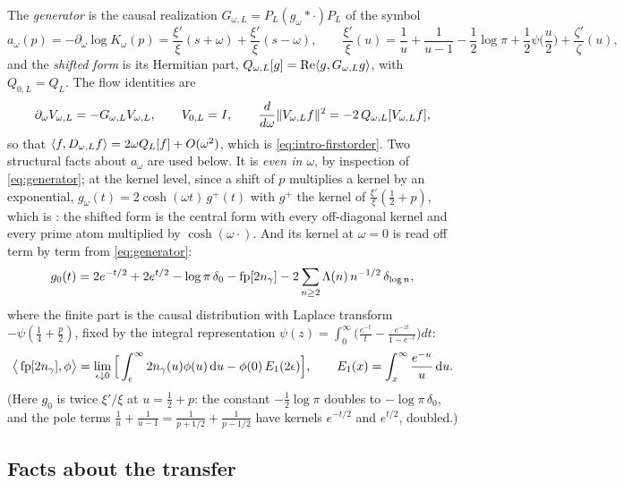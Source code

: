 The \emph{generator} is the causal realization $G_{\omega,L}=P_L(g_\omega*\cdot)P_L$
of the symbol
\begin{equation}\label{eq:generator}
 a_\omega(p)=-\partial_\omega\log K_\omega(p)
 =\frac{\xi'}{\xi}(s+\omega)+\frac{\xi'}{\xi}(s-\omega),
 \qquad
 \frac{\xi'}{\xi}(u)=\frac1u+\frac1{u-1}-\frac12\log\pi+\frac12\psi\Big(\frac u2\Big)+\frac{\zeta'}{\zeta}(u),
\end{equation}
and the \emph{shifted form} is its Hermitian part,
$Q_{\omega,L}[g]=\operatorname{Re}\langle g,G_{\omega,L}g\rangle$, with $Q_{0,L}=Q_L$. The flow
identities \cite[Section~2]{WilsonLines} are
\begin{equation}\label{eq:flow}
 \partial_\omega V_{\omega,L}=-G_{\omega,L}V_{\omega,L},\qquad V_{0,L}=I,\qquad
 \frac{d}{d\omega}\lVert V_{\omega,L}f\rVert^2=-2\,Q_{\omega,L}[V_{\omega,L}f],
\end{equation}
so that $\langle f,D_{\omega,L}f\rangle=2\omega Q_L[f]+O(\omega^2)$, which is
\eqref{eq:intro-firstorder}. Two structural facts about $a_\omega$ are used
below. It is \emph{even in $\omega$}, by inspection of \eqref{eq:generator}; at
the kernel level, since a shift of $p$ multiplies a kernel by an exponential,
$g_\omega(t)=2\cosh(\omega t)\,g^+(t)$ with $g^+$ the kernel of
$\frac{\xi'}{\xi}(\frac12+p)$, which is \cite[Theorem~3.1]{WilsonLines}: the
shifted form is the central form with every off-diagonal kernel and every
prime atom multiplied by $\cosh(\omega\cdot)$. And its kernel at $\omega=0$ is
read off term by term from \eqref{eq:generator}:
\begin{equation}\label{eq:g0}
 g_0(t)=2e^{-t/2}+2e^{t/2}-\log\pi\,\delta_0-\operatorname{fp}[2n_{\gamma}]-2\sum_{n\geq2}\Lambda(n)\,n^{-1/2}\,\delta_{\log n},
\end{equation}
where the finite part is the causal distribution with Laplace transform
$-\psi(\frac14+\frac p2)$, fixed by the integral representation
$\psi(z)=\int_0^\infty\big(\frac{e^{-t}}t-\frac{e^{-zt}}{1-e^{-t}}\big)dt$:
\begin{equation}\label{eq:fp}
 \big\langle\operatorname{fp}[2n_{\gamma}],\phi\big\rangle
 =\lim_{\epsilon\downarrow0}\Big[\int_\epsilon^\infty2n_{\gamma}(u)\phi(u)\,\mathrm d u-\phi(0)\,E_1(2\epsilon)\Big],
 \qquad E_1(x)=\int_x^\infty\frac{e^{-u}}u\,\mathrm d u .
\end{equation}
(Here $g_0$ is twice $\xi'/\xi$ at $u=\frac12+p$: the constant
$-\frac12\log\pi$ doubles to $-\log\pi\,\delta_0$, and the pole terms
$\frac1u+\frac1{u-1}=\frac1{p+1/2}+\frac1{p-1/2}$ have kernels $e^{-t/2}$ and
$e^{t/2}$, doubled.)

\subsection{Facts about the transfer}

